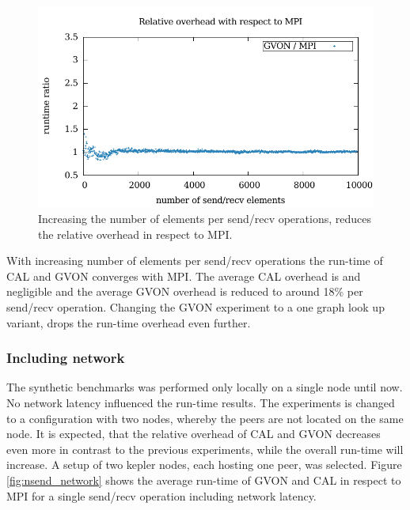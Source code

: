 \begin{figure}[H]
\begin{minipage}[t]{0.5\textwidth}
    \includegraphics[width=\textwidth]{plots/50_nsize_one_lookup_overhead_gvon_kepler}
  \end{minipage}%
  \caption{Increasing the number of elements per send/recv operations, reduces
  the relative overhead in respect to MPI.}
  \label{fig:nsize_kepler}
\end{figure}

\noindent With increasing number of elements per send/recv operations the
run-time of CAL and GVON converges with MPI. The average CAL overhead
is and negligible and the average GVON overhead is reduced to around
18\% per send/recv operation. Changing the GVON experiment to a one
graph look up variant, drops the run-time overhead even
further. 

\subsubsection*{Including network}
The synthetic benchmarks was performed only locally on a single node
until now. No network latency influenced the run-time
results. The experiments is changed to a configuration with two
nodes, whereby the peers are not located on the same node. It is
expected, that the relative overhead of CAL and GVON decreases even
more in contrast to the previous experiments, while the overall
run-time will increase.  A setup of two kepler nodes, each hosting one
peer, was selected.  Figure \ref{fig:nsend_network} shows the average
run-time of GVON and CAL in respect to MPI for a single send/recv
operation including network latency.

